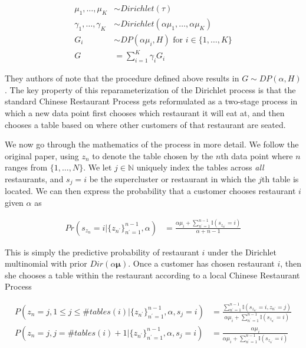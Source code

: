\documentclass{article}
\begin{document}
\begin{align*}
  \mu_1, \ldots, \mu_K &\sim Dirichlet(\tau) \\
  \gamma_1, \ldots, \gamma_K &\sim Dirichlet(\alpha \mu_1, \ldots, \alpha \mu_K) \\
  G_i &\sim DP(\alpha \mu_i, H) \text{ for } i \in \{1, \ldots, K\} \\
  G &= \sum_{i=1}^K \gamma_i G_i
\end{align*}

They authors of \cite{lovell2012} note that the procedure defined
above results in $G \sim DP(\alpha, H)$. The key property of this
reparameterization of the Dirichlet process is that the standard
Chinese Restaurant Process gets reformulated as a two-stage process in
which a new data point first chooses which restaurant it will eat at,
and then chooses a table based on where other customers of that
restaurant are seated.

We now go through the mathematics of the process in more detail. We
follow the original paper, using $z_n$ to denote the table chosen by
the $n$th data point where $n$ ranges from $\{1, \ldots, N\}$. We let
$j \in \mathbb{N}$ uniquely index the tables across \textit{all}
restaurants, and $s_j = i$ be the supercluster or restaurant in which
the $j$th table is located. We can then express the probability that a
customer chooses restaurant $i$ given $\alpha$ as

\begin{align}
  Pr(s_{z_n} = i | \{z_{n^\prime}\}_{n^{\prime}=1}^{n-1}, \alpha)
  &= \frac{\alpha \mu_i + \sum_{n^\prime = 1}^{n-1} \mathbb{I}(s_{z_{n^\prime}} = i)}{\alpha + n - 1}
\end{align}

This is simply the predictive probability of restaurant $i$ under the
Dirichlet multinomial with prior $Dir(\alpha\boldsymbol{\mu})$. Once a
customer has chosen restaurant $i$, then she chooses a table within
the restaurant according to a local Chinese Restaurant Process

\begin{align}
  P(z_n = j, 1 \le j \le \#tables(i) | \{z_{n^\prime}\}_{n^{\prime}=1}^{n-1}, \alpha, s_j = i)
  &= \frac{\sum_{n^\prime = 1}^{n-1} \mathbb{I}(s_{z_{n^\prime}} = i, z_{n^\prime} = j)}
          {\alpha \mu_i + \sum_{n^\prime = 1}^{n-1} \mathbb{I}(s_{z_{n^\prime}} = i)} \\
  P(z_n = j, j = \#tables(i) + 1 | \{z_{n^\prime}\}_{n^{\prime}=1}^{n-1}, \alpha, s_j = i)
  &= \frac{\alpha \mu_i}{\alpha \mu_i + \sum_{n^\prime = 1}^{n-1} \mathbb{I}(s_{z_{n^\prime}} = i)}
\end{align}
\end{document}
